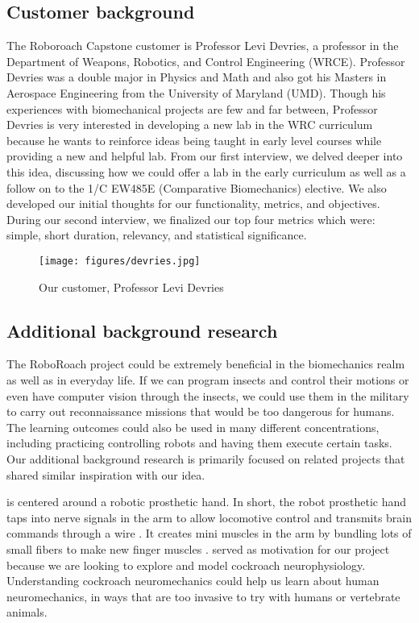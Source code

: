 \documentclass[twocolumn,10pt]{IEEEtran}
\begin{document}
\subsection{Customer background}
The Roboroach Capstone customer is Professor Levi Devries, a professor in the Department of Weapons, Robotics, and Control Engineering (WRCE). Professor Devries was a double major in Physics and Math and also got his Masters in Aerospace Engineering from the University of Maryland (UMD). Though his experiences with biomechanical projects are few and far between, Professor Devries is very interested in developing a new lab in the WRC curriculum because he wants to reinforce ideas being taught in early level courses while providing a new and helpful lab. From our first interview, we delved deeper into this idea, discussing how we could offer a lab in the early curriculum as well as a follow on to the 1/C EW485E (Comparative Biomechanics) elective. We also developed our initial thoughts for our functionality, metrics, and objectives. During our second interview, we finalized our top four metrics which were: simple, short duration, relevancy, and statistical significance. 
\begin{figure}
\begin{center}
\texttt{[image: figures/devries.jpg]}
\end{center}
\caption{Our customer, Professor Levi Devries}
\label{fig:profdevries}
\end{figure}

\subsection{Additional background research}
The RoboRoach project could be extremely beneficial in the biomechanics realm as well as in everyday life. If we can program insects and control their motions or even have computer vision through the insects, we could use them in the military to carry out reconnaissance missions that would be too dangerous for humans. The learning outcomes could also be used in many different concentrations, including practicing controlling robots and having them execute certain tasks. Our additional background research is primarily focused on related projects that shared similar inspiration with our idea. 

\cite{servick2020minimuscles} is centered around a robotic prosthetic hand. In short, the robot prosthetic hand taps into nerve signals in the arm to allow locomotive control and transmits brain commands through a wire \cite{servick2020minimuscles}. It creates mini muscles in the arm by bundling lots of small fibers to make new finger muscles \cite{servick2020minimuscles}. \cite{servick2020minimuscles} served as motivation for our project because we are looking to explore and model cockroach neurophysiology. Understanding cockroach neuromechanics could help us learn about human neuromechanics, in ways that are too invasive to try with humans or vertebrate animals. 
\end{document}
